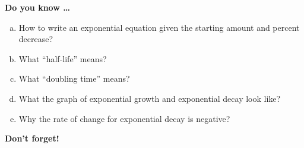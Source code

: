 \newpage



\bigskip

\noindent \textbf{Do you know \ldots} %

\begin{enumerate} [(a)]
\item How to write an exponential equation given the starting amount and percent decrease? 
\item What ``half-life'' means? 
\item What ``doubling time'' means?     
\item What the graph of exponential growth and exponential decay look like? 
\item Why the rate of change for exponential decay is negative? 
\end{enumerate}

\bigskip

\noindent \textbf{Don't forget!}

